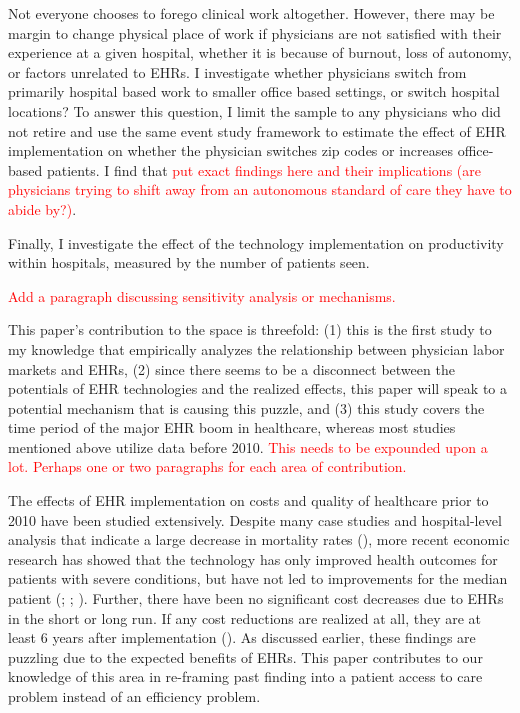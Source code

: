 \documentclass[11pt]{article}
\begin{document}
Not everyone chooses to forego clinical work altogether. However, there may be margin to change physical place of work if physicians are not satisfied with their experience at a given hospital, whether it is because of burnout, loss of autonomy, or factors unrelated to EHRs. I investigate whether physicians switch from primarily hospital based work to smaller office based settings, or switch hospital locations? To answer this question, I limit the sample to any physicians who did not retire and use the same event study framework to estimate the effect of EHR implementation on whether the physician switches zip codes or increases office-based patients. I find that \textcolor{red}{put exact findings here and their implications (are physicians trying to shift away from an autonomous standard of care they have to abide by?)}. 

Finally, I investigate the effect of the technology implementation on productivity within hospitals, measured by the number of patients seen. 


\textcolor{red}{Add a paragraph discussing sensitivity analysis or mechanisms.}

This paper's contribution to the space is threefold: (1) this is the first study to my knowledge that empirically analyzes the relationship between physician labor markets and EHRs, (2) since there seems to be a disconnect between the potentials of EHR technologies and the realized effects, this paper will speak to a potential mechanism that is causing this puzzle, and (3) this study covers the time period of the major EHR boom in healthcare, whereas most studies mentioned above utilize data before 2010. \textcolor{red}{This needs to be expounded upon a lot. Perhaps one or two paragraphs for each area of contribution.}

The effects of EHR implementation on costs and quality of healthcare prior to 2010 have been studied extensively. Despite many case studies and hospital-level analysis that indicate a large decrease in mortality rates (\cite{Buntin2011TheResults}), more recent economic research has showed that the technology has only improved health outcomes for patients with severe conditions, but have not led to improvements for the median patient (\cite{Agha2014TheCare}; \cite{McCullough2016HealthCoordination}; \cite{Meyerhoefer}). Further, there have been no significant cost decreases due to EHRs in the short or long run. If any cost reductions are realized at all, they are at least 6 years after implementation (\cite{dranove2014trillion}). As discussed earlier, these findings are puzzling due to the expected benefits of EHRs. This paper contributes to our knowledge of this area in re-framing past finding into a patient access to care problem instead of an efficiency problem.
\end{document}
